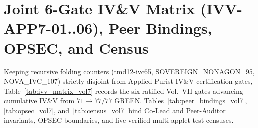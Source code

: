 \documentclass[11pt,a4paper,reqno]{article}
\def\texttt#1{#1}%
\theoremstyle{plain}
\theoremstyle{definition}
\theoremstyle{remark}
\numberwithin{equation}{section}
\numberwithin{table}{section}
\begin{document}
\section{Joint 6-Gate IV\&V Matrix (\texttt{IVV-APP7-01..06}), Peer Bindings, OPSEC, and Census}
\label{sec:ivv_vol7}

Keeping recursive folding counters (\texttt{tmd12-ivc65}, \texttt{SOVEREIGN\_NONAGON\_95}, \texttt{NOVA\_IVC\_107}) strictly disjoint from Applied Purist IV\&V certification gates, Table~\ref{tab:ivv_matrix_vol7} records the six ratified Vol.~VII gates advancing cumulative IV\&V from $71 \to 77/77$ GREEN. Tables~\ref{tab:peer_bindings_vol7}, \ref{tab:opsec_vol7}, and~\ref{tab:census_vol7} bind Co-Lead and Peer-Auditor invariants, OPSEC boundaries, and live verified multi-applet test censuses.
\end{document}
